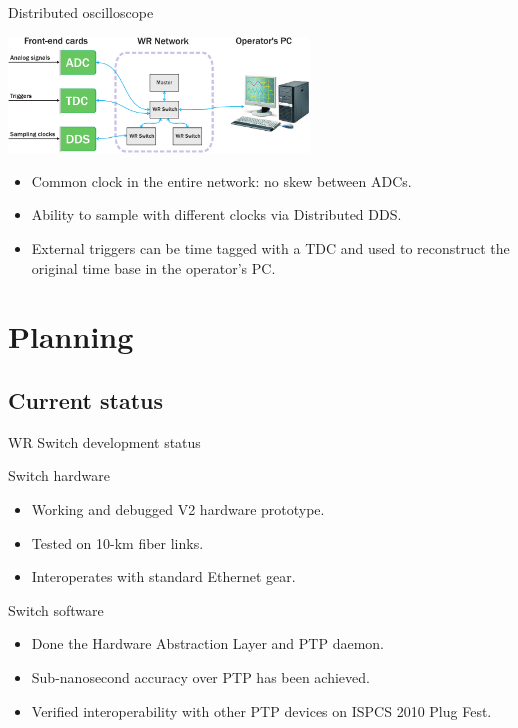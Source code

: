 \documentclass[compress,red]{beamer}
\begin{document}
\begin{frame}{Distributed oscilloscope}
  \begin{center}
    \includegraphics[width=8cm]{applications/distr_oscill}
    \end{center}
    \begin{block}{}
      \begin{itemize}
      \item Common clock in the entire network: no skew between ADCs.
      \item Ability to sample with different clocks via Distributed DDS.
      \item External triggers can be time tagged with a TDC and used to reconstruct the original time base in the operator's PC.
      \end{itemize}
    \end{block}
\end{frame}



\section{Planning}

\subsection{Current status}

\begin{frame}{WR Switch development status}
	\begin{block}{Switch hardware}
          \begin{itemize}
            \item Working and debugged V2 hardware prototype.
            \item Tested on 10-km fiber links.
            \item Interoperates with standard Ethernet gear.
            \end{itemize}
            \end{block}

	\begin{block}{Switch software}
          \begin{itemize}
            \item Done the Hardware Abstraction Layer and PTP daemon. 
            \item Sub-nanosecond accuracy over PTP has been achieved.
            \item Verified interoperability with other PTP devices on ISPCS 2010 Plug Fest.
            \end{itemize}
          \end{block}
\end{frame}
\end{document}
